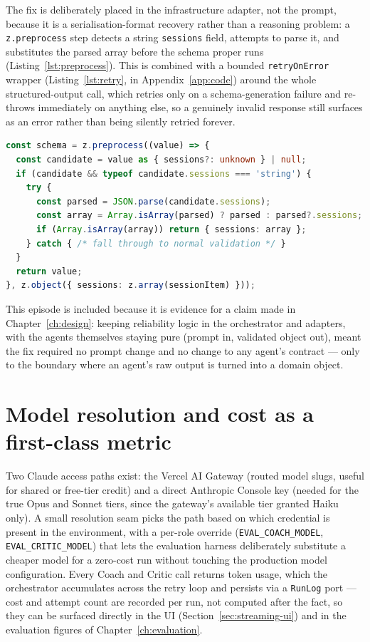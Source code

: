 The fix is deliberately placed in the infrastructure adapter, not the prompt, because it is a serialisation-format recovery rather than a reasoning problem: a \texttt{z.preprocess} step detects a string \texttt{sessions} field, attempts to parse it, and substitutes the parsed array before the schema proper runs (Listing~\ref{lst:preprocess}). This is combined with a bounded \texttt{retryOnError} wrapper (Listing~\ref{lst:retry}, in Appendix~\ref{app:code}) around the whole structured-output call, which retries only on a schema-generation failure and re-throws immediately on anything else, so a genuinely invalid response still surfaces as an error rather than being silently retried forever.

\begin{lstlisting}[language=TypeScript, caption={Recovering Opus's occasional double-stringified \texttt{sessions} field before Zod validation runs.}, label={lst:preprocess}]
const schema = z.preprocess((value) => {
  const candidate = value as { sessions?: unknown } | null;
  if (candidate && typeof candidate.sessions === 'string') {
    try {
      const parsed = JSON.parse(candidate.sessions);
      const array = Array.isArray(parsed) ? parsed : parsed?.sessions;
      if (Array.isArray(array)) return { sessions: array };
    } catch { /* fall through to normal validation */ }
  }
  return value;
}, z.object({ sessions: z.array(sessionItem) }));
\end{lstlisting}

This episode is included because it is evidence for a claim made in Chapter~\ref{ch:design}: keeping reliability logic in the orchestrator and adapters, with the agents themselves staying pure (prompt in, validated object out), meant the fix required no prompt change and no change to any agent's contract --- only to the boundary where an agent's raw output is turned into a domain object.

\section{Model resolution and cost as a first-class metric}

Two Claude access paths exist: the Vercel AI Gateway (routed model slugs, useful for shared or free-tier credit) and a direct Anthropic Console key (needed for the true Opus and Sonnet tiers, since the gateway's available tier granted Haiku only). A small resolution seam picks the path based on which credential is present in the environment, with a per-role override (\texttt{EVAL\_COACH\_MODEL}, \texttt{EVAL\_CRITIC\_MODEL}) that lets the evaluation harness deliberately substitute a cheaper model for a zero-cost run without touching the production model configuration. Every Coach and Critic call returns token usage, which the orchestrator accumulates across the retry loop and persists via a \texttt{RunLog} port --- cost and attempt count are recorded per run, not computed after the fact, so they can be surfaced directly in the UI (Section~\ref{sec:streaming-ui}) and in the evaluation figures of Chapter~\ref{ch:evaluation}.


